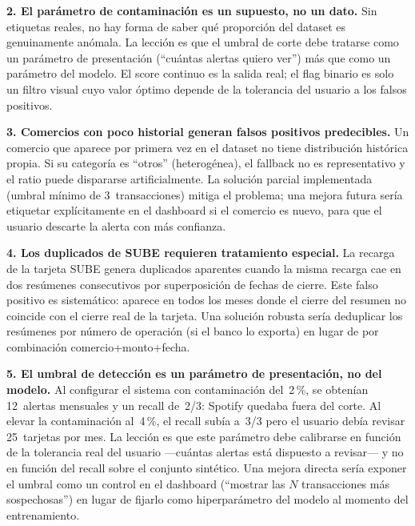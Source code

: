 \documentclass[conference]{IEEEtran}
\begin{document}
\textbf{2. El par\'ametro de contaminaci\'on es un supuesto, no un dato.}
Sin etiquetas reales, no hay forma de saber qu\'e proporci\'on del dataset es
genuinamente an\'omala. La lecci\'on es que el umbral de corte debe tratarse como
un par\'ametro de presentaci\'on (``cu\'antas alertas quiero ver'') m\'as que como
un par\'ametro del modelo. El score continuo es la salida real; el flag binario es
solo un filtro visual cuyo valor \'optimo depende de la tolerancia del usuario a
los falsos positivos.

\textbf{3. Comercios con poco historial generan falsos positivos predecibles.}
Un comercio que aparece por primera vez en el dataset no tiene distribuci\'on
hist\'orica propia. Si su categor\'ia es ``otros'' (heterog\'enea), el fallback
no es representativo y el ratio puede dispararse artificialmente. La soluci\'on
parcial implementada (umbral m\'inimo de 3~transacciones) mitiga el problema;
una mejora futura ser\'ia etiquetar expl\'icitamente en el dashboard si el comercio
es nuevo, para que el usuario descarte la alerta con m\'as confianza.

\textbf{4. Los duplicados de SUBE requieren tratamiento especial.}
La recarga de la tarjeta SUBE genera duplicados aparentes cuando la misma recarga
cae en dos res\'umenes consecutivos por superposici\'on de fechas de cierre. Este
falso positivo es sistem\'atico: aparece en todos los meses donde el cierre del
resumen no coincide con el cierre real de la tarjeta. Una soluci\'on robusta
ser\'ia deduplicar los res\'umenes por n\'umero de operaci\'on (si el banco lo
exporta) en lugar de por combinaci\'on comercio+monto+fecha.

\textbf{5. El umbral de detecci\'on es un par\'ametro de presentaci\'on, no del modelo.}
Al configurar el sistema con contaminaci\'on del~2\,\%, se obten\'ian 12~alertas
mensuales y un recall de~2/3: Spotify quedaba fuera del corte. Al elevar la
contaminaci\'on al~4\,\%, el recall sub\'ia a~3/3 pero el usuario deb\'ia revisar
25~tarjetas por mes. La lecci\'on es que este par\'ametro debe calibrarse en funci\'on
de la tolerancia real del usuario ---cu\'antas alertas est\'a dispuesto a revisar---
y no en funci\'on del recall sobre el conjunto sint\'etico. Una mejora directa
ser\'ia exponer el umbral como un control en el dashboard
(``mostrar las $N$ transacciones m\'as sospechosas'') en lugar de fijarlo como
hiperpar\'ametro del modelo al momento del entrenamiento.
\end{document}
